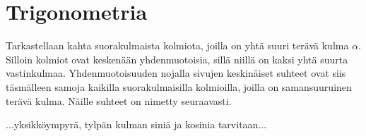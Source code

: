 
\section*{Trigonometria}

Tarkastellaan kahta suorakulmaista kolmiota, joilla on yhtä suuri terävä kulma $\alpha$.
Silloin kolmiot ovat keskenään yhdenmuotoisia, sillä niillä on kaksi yhtä suurta vastinkulmaa.
Yhdenmuotoisuuden nojalla sivujen keskinäiset suhteet ovat siis täsmälleen samoja kaikilla
suorakulmaisilla kolmioilla, joilla on samansuuruinen terävä kulma. Näille suhteet on
nimetty seuraavasti.


...yksikköympyrä, tylpän kulman siniä ja kosinia tarvitaan...